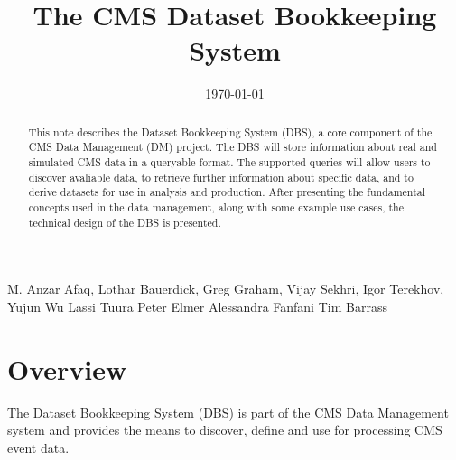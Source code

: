 \documentclass{cmspaper}
\begin{document}

\begin{titlepage}

   \date{\today}

  \title{The CMS Dataset Bookkeeping System}


  \begin{Authlist}
    M. Anzar Afaq, Lothar Bauerdick, Greg Graham, Vijay Sekhri, Igor Terekhov, 
    Yujun Wu
    Lassi Tuura
    Peter Elmer
    Alessandra Fanfani
    Tim Barrass
  \end{Authlist}


  \begin{abstract}
    This note describes the Dataset Bookkeeping System (DBS), a core component 
    of the CMS Data Management (DM) project.  The DBS will store information
    about real and simulated CMS data in a queryable format.  The supported
    queries will allow users to discover avaliable data, to retrieve further 
    information about specific data, and to derive datasets for use in 
    analysis and production. After presenting the fundamental concepts used
    in the data management, along with some example use cases, the technical 
    design of the DBS is presented.
  \end{abstract} 

  
\end{titlepage}

\setcounter{page}{2}%
\tableofcontents

\section{Overview}
\label{sec:intro}

The Dataset Bookkeeping System (DBS) is part of the CMS Data Management system
and provides the means to discover, define and use for processing CMS event 
data. 
\end{document}
